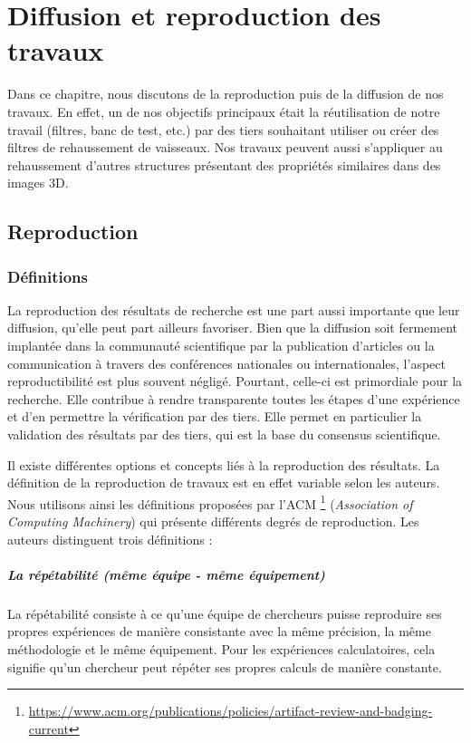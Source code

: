 \chapter{Diffusion et reproduction des travaux}
\label{sec:reproductibility}
Dans ce chapitre, nous discutons de la reproduction puis de la diffusion de nos travaux. En effet, un de nos objectifs principaux était la réutilisation de notre travail (filtres, banc de test, etc.) par des tiers souhaitant utiliser ou créer des filtres de rehaussement de vaisseaux. Nos travaux peuvent aussi s'appliquer au rehaussement d'autres structures présentant des propriétés similaires dans des images 3D.
\section{Reproduction}
\subsection{Définitions}
La reproduction des résultats de recherche est une part aussi importante que leur diffusion, qu'elle peut part ailleurs favoriser. Bien que la diffusion soit fermement implantée dans la communauté scientifique par la publication d'articles ou la communication à travers des conférences nationales ou internationales, l'aspect reproductibilité est plus souvent négligé. Pourtant, celle-ci est primordiale pour la recherche. Elle contribue à rendre transparente toutes les étapes d'une expérience et d'en permettre la vérification par des tiers. Elle permet en particulier la validation des résultats par des tiers, qui est la base du consensus scientifique.

Il existe différentes options et concepts liés à la reproduction des résultats. La définition de la reproduction de travaux est en effet variable selon les auteurs. Nous utilisons ainsi les définitions proposées par l'ACM \footnote{\url{https://www.acm.org/publications/policies/artifact-review-and-badging-current}} (\textit{Association of Computing Machinery}) qui présente différents degrés de reproduction. Les auteurs distinguent trois définitions : 
\paragraph{La répétabilité (même équipe - même équipement)}
La répétabilité consiste à ce qu'une équipe de chercheurs puisse reproduire ses propres expériences de manière consistante avec la même précision, la même méthodologie et le même équipement. Pour les expériences calculatoires, cela signifie qu'un chercheur peut répéter ses propres calculs de manière constante.
